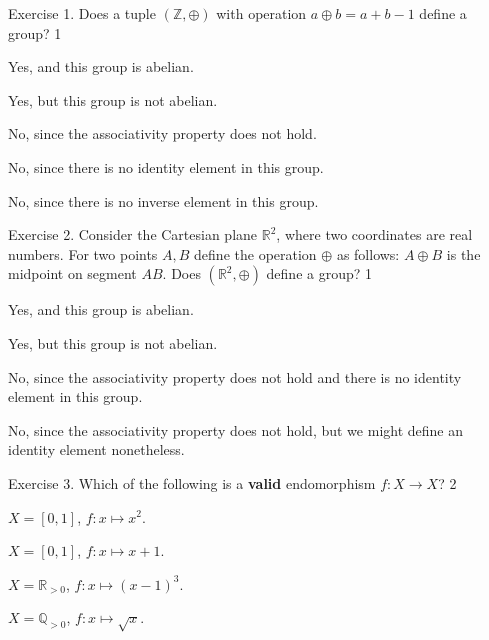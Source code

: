 \documentclass[../lecture-notes-148x210.tex]{subfiles}
\begin{document}
\begin{xexercise}
    {Exercise 1.}
    {Does a tuple $(\mathbb{Z},\oplus)$ with operation $a \oplus b = a + b - 1$ define a group?}
    {1}
    {
        \item Yes, and this group is abelian.
        \item Yes, but this group is not abelian.
        \item No, since the associativity property does not hold.
        \item No, since there is no identity element in this group.
        \item No, since there is no inverse element in this group.
    }
\end{xexercise}

\begin{xexercise}
    {Exercise 2.}
    {Consider the Cartesian plane $\mathbb{R}^2$, where two coordinates are real numbers. For two points $A,B$ 
    define the operation $\oplus$ as follows: $A \oplus B$ is the midpoint on segment $AB$. Does 
    $(\mathbb{R}^2, \oplus)$ define a group?}
    {1}
    {
        \item Yes, and this group is abelian.
        \item Yes, but this group is not abelian.
        \item No, since the associativity property does not hold and there is no identity element in this group.
        \item No, since the associativity property does not hold, but we might define an identity element nonetheless.
    }
\end{xexercise}

\begin{xexercise}
    {Exercise 3.}
    {Which of the following is a \textbf{valid} endomorphism $f: X \to X$? }
    {2}
    {
        \item $X = [0,1]$, $f: x \mapsto x^2$.
        \item $X = [0,1]$, $f: x \mapsto x + 1$.
        \item $X = \mathbb{R}_{>0}$, $f: x \mapsto (x-1)^3$.
        \item $X = \mathbb{Q}_{>0}$, $f: x \mapsto \sqrt{x}$.
    }
\end{xexercise}
\end{document}
